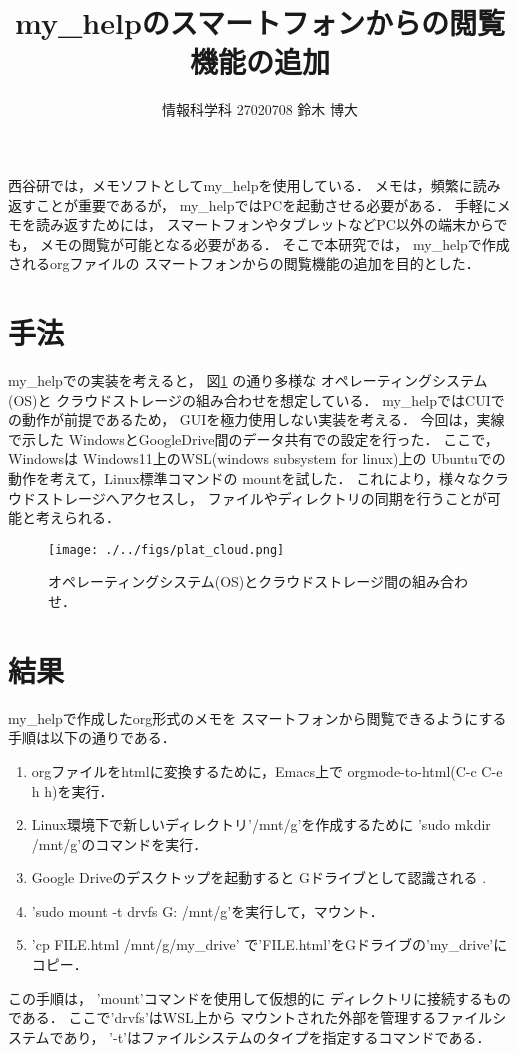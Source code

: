 \documentclass[a4j,twocolumn]{jsarticle}
\begin{document}
\title{my\_helpのスマートフォンからの閲覧機能の追加}
\author{情報科学科 \hspace{5mm} 27020708 \hspace{5mm} 鈴木 博大}
\date{}

\maketitle
\label{sec:org5a1197a}
西谷研では，メモソフトとしてmy\_helpを使用している．
メモは，頻繁に読み返すことが重要であるが，
my\_helpではPCを起動させる必要がある．
手軽にメモを読み返すためには，
スマートフォンやタブレットなどPC以外の端末からでも，
メモの閲覧が可能となる必要がある．
そこで本研究では，
my\_helpで作成されるorgファイルの
スマートフォンからの閲覧機能の追加を目的とした．

\section{手法}
\label{sec:orge37fc15}
my\_helpでの実装を考えると，
図\ref{fig:orgce283a0} の通り多様な
オペレーティングシステム(OS)と
クラウドストレージの組み合わせを想定している．
my\_helpではCUIでの動作が前提であるため，
GUIを極力使用しない実装を考える．
今回は，実線で示した
WindowsとGoogleDrive間のデータ共有での設定を行った．
ここで，Windowsは
Windows11上のWSL(windows subsystem for linux)上の
Ubuntuでの動作を考えて，Linux標準コマンドの
mountを試した．
これにより，様々なクラウドストレージへアクセスし，
ファイルやディレクトリの同期を行うことが可能と考えられる．

\begin{figure}[htbp]
\centering
\texttt{[image: ./../figs/plat\_cloud.png]}
\caption{\label{fig:orgce283a0}オペレーティングシステム(OS)とクラウドストレージ間の組み合わせ．}
\end{figure}


\section{結果}
\label{sec:org220798e}
my\_helpで作成したorg形式のメモを
スマートフォンから閲覧できるようにする手順は以下の通りである．
\begin{enumerate}
\item orgファイルをhtmlに変換するために，Emacs上で
orgmode-to-html(C-c C-e h h)を実行．
\item Linux環境下で新しいディレクトリ'/mnt/g'を作成するために
'sudo mkdir /mnt/g'のコマンドを実行．
\item Google Driveのデスクトップを起動すると
Gドライブとして認識される\cite{mount} .
\item 'sudo mount -t drvfs G: /mnt/g'を実行して，マウント．
\item 'cp FILE.html /mnt/g/my\_drive'
で'FILE.html'をGドライブの'my\_drive'にコピー．
\end{enumerate}
この手順は，
'mount'コマンドを使用して仮想的に
ディレクトリに接続するものである．
ここで'drvfs'はWSL上から
マウントされた外部を管理するファイルシステムであり，
'-t'はファイルシステムのタイプを指定するコマンドである．
\end{document}
